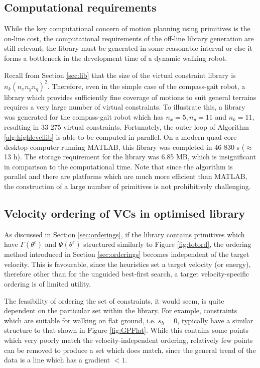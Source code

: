 \subsection{Computational requirements} \label{sec:vcgenres}
While the key computational concern of motion planning using primitives is the on-line cost, the computational requirements of the off-line library generation are still relevant; the library must be generated in some reasonable interval or else it forms a bottleneck in the development time of a dynamic walking robot.

Recall from Section \ref{sec:lib} that the size of the virtual constraint library is $n_k(n_xn_yn_q)^2$. Therefore, even in the simple case of the compass-gait robot, a library which provides sufficiently fine coverage of motions to suit general terrains requires a very large number of virtual constraints. To illustrate this, a library was generated for the compass-gait robot which has $n_x=5,n_y=11$ and $n_k=11$, resulting in 33 275 virtual constraints. Fortunately, the outer loop of Algorithm \ref{alg:highlevellib} is able to be computed in parallel. On a modern quad-core desktop computer running MATLAB, this library was completed in 46 830 s ($\approx$ 13 h). The storage requirement for the library was 6.85 MB, which is insignificant in comparison to the computational time. Note that since the algorithm is parallel and there are platforms which are much more efficient than MATLAB, the construction of a large number of primitives is not prohibitively challenging.

\subsection{Velocity ordering of VCs in optimised library}
As discussed in Section \ref{sec:orderings}, if the library contains primitives which have $\Gamma(\theta^c)$ and $\Psi(\theta^c)$ structured similarly to Figure \ref{fig:totord}, the ordering method introduced in Section \ref{sec:orderings} becomes independent of the target velocity. This is favourable, since the heuristics set a target velocity (or energy), therefore other than for the unguided best-first search, a target velocity-specific ordering is of limited utility.

The feasibility of ordering the set of constraints, it would seem, is quite dependent on the particular set within the library. For example, constraints which are suitable for walking on flat ground, i.e. $s_h=0$, typically have a similar structure to that shown in Figure \ref{fig:GPFlat}. While this contains some points which very poorly match the velocity-independent ordering, relatively few points can be removed to produce a set which does match, since the general trend of the data is a line which has a gradient $<1$.

